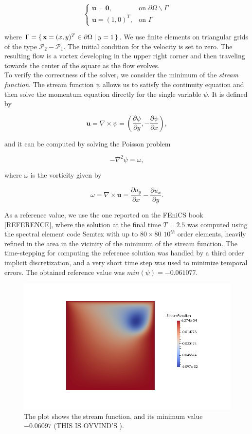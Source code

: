 \documentclass[11pt,a4paper,titlepage]{report}
\begin{document}
\[
\begin{cases}
\mathbf{u = 0}, & \mbox{on } \partial \Omega \backslash \Gamma \\
\mathbf{u} = (1,0)^T, & \mbox{on } \Gamma
\end{cases}
\]

where $ \Gamma = \set{ \mathbf{x} = (x,y)^T \in \partial \Omega | y = 1}$. We use finite elements on triangular grids of the type $\mathcal{P}_2-\mathcal{P}_1$. The initial condition for the velocity is set to zero. The resulting flow is a vortex developing in the upper right corner and then traveling towards the center of the square as the flow evolves. \\
To verify the correctness of the solver, we consider the minimum of the \textit{stream function}. The stream function $\psi$ allows us to satisfy the continuity equation and then solve the momentum equation directly for the single variable $\psi$. It is defined by

\[
\mathbf{u} = \nabla \times \psi = (\frac{\partial \psi}{\partial y} , - \frac{\partial \psi }{\partial x}),
\]

and it can be computed by solving the Poisson problem

\[
- \nabla^2 \psi = \omega,
\]

where $\omega$ is the vorticity given by

\[
\omega = \nabla \times \mathbf{u} = \frac{\partial u_y}{\partial x} - \frac{\partial u_x}{\partial y}.
\]


As a reference value, we use the one reported on the FEniCS book [REFERENCE], where the solution at the final time $T = 2.5$ was computed using the spectral element code Semtex with up to $80 \times 80$ $10^{th}$ order elements, heavily refined in the area in the vicinity of the minimum of the stream function. The time-stepping for computing the reference solution was handled by a third order implicit discretization, and a very short time step was used to minimize temporal errors.  The obtained reference value was $min(\psi) = -0.061 077$.

\begin{figure}[ht]
\centering
\includegraphics[width=\textwidth]{images/oyvind.png}
\vspace{-1cm}
\caption{The plot shows the stream function, and its minimum value $-0.06097$ (THIS IS OYVIND'S ).}
\end{figure}
\end{document}
